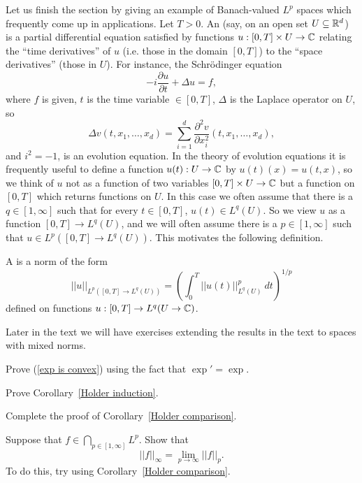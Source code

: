 Let us finish the section by giving an example of Banach-valued $L^p$ spaces which frequently come up in applications.
Let $T > 0$. An  (say, on an open set $U \subseteq \mathbb{R}^d$) is a partial differential equation satisfied by functions $u: [0, T] \times U \to \mathbb{C}$ relating the ``time derivatives'' of $u$ (i.e. those in the domain $[0, T]$) to the ``space derivatives'' (those in $U$).
For instance, the Schr\"odinger equation
\[-i\frac{\partial u}{\partial t} + \Delta u = f,\]
where $f$ is given, $t$ is the time variable $\in [0, T]$, $\Delta$ is the Laplace operator on $U$, so
\[\Delta v(t, x_1, \dots, x_d) = \sum_{i=1}^{d} \frac{\partial^2 v}{\partial x_i^2} (t, x_1, \dots, x_d), \]
and $i^2 = -1$, is an evolution equation.
In the theory of evolution equations it is frequently useful to define a function $u(t): U \to \mathbb{C}$ by $u(t)(x) = u(t, x)$, so we think of $u$ not as a function of two variables $[0, T] \times U \to \mathbb{C}$ but a function on $[0, T]$ which returns functions on $U$.
In this case we often assume that there is a $q \in [1, \infty]$ such that for every $t \in [0, T]$, $u(t) \in L^q(U)$.
So we view $u$ as a function $[0, T] \to L^q(U)$, and we will often assume there is a $p \in [1, \infty]$ such that $u \in L^p([0, T] \to L^q(U))$.
This motivates the following definition.

\begin{definition}
A  is a norm of the form
\[||u||_{L^p([0, T] \to L^q(U))} = \left(\int_0^{T} ||u(t)||_{L^q(U)}^p~dt\right)^{1/p}\]
defined on functions $u: [0, T] \to L^q(U \to \mathbb{C})$.
\end{definition}

Later in the text we will have exercises extending the results in the text to spaces with mixed norms.

\begin{exercise}
\label{exp is convex exer}
Prove (\ref{exp is convex}) using the fact that $\exp' = \exp$.
\end{exercise}

\begin{exercise}
\label{Holder induction exer}
Prove Corollary~\ref{Holder induction}.
\end{exercise}

\begin{exercise}
\label{granular comparison}
Complete the proof of Corollary~\ref{Holder comparison}.
\end{exercise}

\begin{exercise}
Suppose that $f \in \bigcap_{p \in [1, \infty]} L^p$. Show that
\[||f||_{\infty} = \lim_{p \to \infty} ||f||_{p} .\]
To do this, try using Corollary~\ref{Holder comparison}.
\end{exercise}

